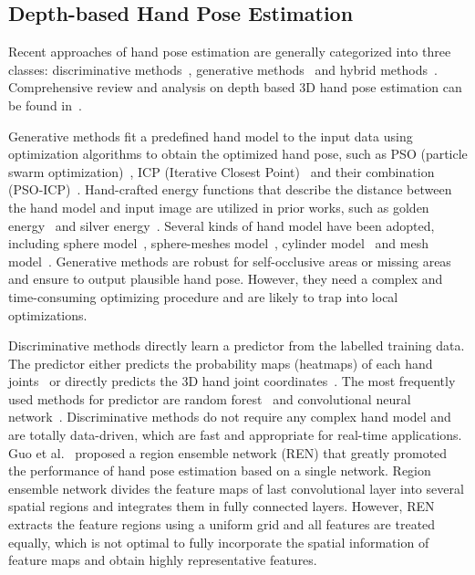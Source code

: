 \documentclass[final, 5p]{elsarticle}
\begin{document}
\subsection{Depth-based Hand Pose Estimation}
Recent approaches of hand pose estimation are generally categorized into three classes: discriminative methods~\cite{tompson2014real, tang2014latent, oberweger2015hands, sun2015cascaded, wan2016hand, wan2017crossing, ge2016robust, valentin2016learning, zhang2016learning, ge2017threedcnn, guo2017region}, generative methods~\cite{tagliasacchi2015robust, tkach2016sphere, joseph2016fits, taylor2016efficient} and hybrid methods~\cite{krejov2015combining, tang2015opening, choi2015collaborative, sridhar2015fast, sharp2015accurate, YeSpatialHandECCV2016, zhou2016model}.
Comprehensive review and analysis on depth based 3D hand pose estimation can be found in~\cite{supancic2015depth}.

Generative methods fit a predefined hand model to the input data using optimization algorithms to obtain the optimized hand pose, such as PSO (particle swarm optimization)~\cite{sharp2015accurate}, ICP (Iterative Closest Point)~\cite{tagliasacchi2015robust} and their combination (PSO-ICP)~\cite{qian2014realtime}. Hand-crafted energy functions that describe the distance between the hand model and input image are utilized in prior works, such as golden energy~\cite{sharp2015accurate} and silver energy~\cite{tang2015opening}. Several kinds of hand model have been adopted, including sphere model~\cite{qian2014realtime}, sphere-meshes model~\cite{tkach2016sphere}, cylinder model~\cite{tagliasacchi2015robust} and mesh model~\cite{sharp2015accurate}.
Generative methods are robust for self-occlusive areas or missing areas and ensure to output plausible hand pose. However, they need a complex and time-consuming optimizing procedure and are likely to trap into local optimizations.

Discriminative methods directly learn a predictor from the labelled training data. The predictor either predicts the probability maps (heatmaps) of each hand joints~\cite{tompson2014real, ge2016robust} or directly predicts the 3D hand joint coordinates~\cite{oberweger2015hands, guo2017region}. The most frequently used methods for predictor are random forest~\cite{tang2013real, tang2014latent, liang2014parsing, tang2015opening, sun2015cascaded} and convolutional neural network~\cite{tompson2014real, oberweger2015hands, guo2017region, wan2017crossing, ge2017threedcnn}.
Discriminative methods do not require any complex hand model and are totally data-driven, which are fast and appropriate for real-time applications. Guo et al.~\cite{guo2017region, wang2018region} proposed a region ensemble network (REN) that greatly promoted the performance of hand pose estimation based on a single network. Region ensemble network divides the feature maps of last convolutional layer into several spatial regions and integrates them in fully connected layers. However, REN extracts the feature regions using a uniform grid and all features are treated equally, which is not optimal to fully incorporate the spatial information of feature maps and obtain highly representative features.
\end{document}
